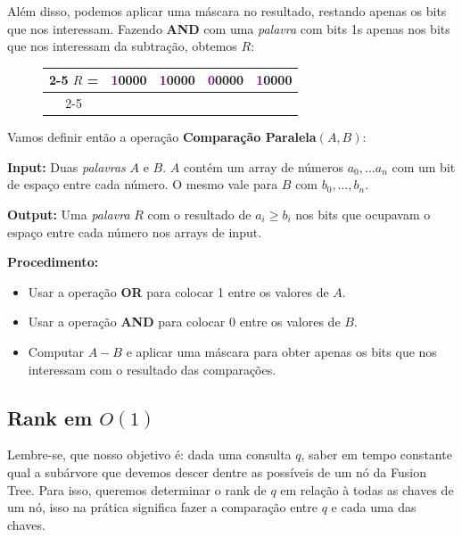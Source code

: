 Além disso, podemos aplicar uma máscara no resultado, restando apenas os bits
que nos interessam. Fazendo \textbf{AND} com uma \textit{palavra} com bits 1s
apenas nos bits que nos interessam da subtração, obtemos $R$:

\begin{figure}[h]
\bf \Large \centering
\begin{tabular}{c|cccc|}
\cline{2-5}
\textcolor{CarnationPink}{$R$} = &
\textcolor{Purple}{1}\textcolor{CarnationPink}{0000} &
\textcolor{Purple}{1}\textcolor{CarnationPink}{0000} &
\textcolor{Purple}{0}\textcolor{CarnationPink}{0000} &
\textcolor{Purple}{1}\textcolor{CarnationPink}{0000} \\
\cline{2-5}
\end{tabular}
\end{figure}

Vamos definir então a operação \textbf{Comparação Paralela}$(A,B)$:

\textbf{Input:} Duas \textit{palavras} $A$ e $B$. $A$ contém um array de números
$a_0,\dots a_n$ com um bit de espaço entre cada número. O mesmo vale para $B$
com $b_0,\dots,b_n$.

\textbf{Output:} Uma \textit{palavra} $R$ com o resultado de $a_i\geq b_i$ nos
bits que ocupavam o espaço entre cada número nos arrays de input.



\textbf{Procedimento:}
\begin{itemize}
    \item Usar a operação \textbf{OR} para colocar 1 entre os valores de $A$.
    \item Usar a operação \textbf{AND} para colocar 0 entre os valores de $B$.
    \item Computar $A-B$ e aplicar uma máscara para obter apenas os bits que nos
    interessam com o resultado das comparações.
\end{itemize}

\subsection{Rank em $O(1)$}

Lembre-se, que nosso objetivo é: dada uma consulta $q$, saber em tempo constante
qual a subárvore que devemos descer dentre as possíveis de um nó da Fusion Tree.
Para isso, queremos determinar o rank de $q$ em relação à todas as chaves de um
nó, isso na prática significa fazer a comparação entre $q$ e cada uma das
chaves. 

